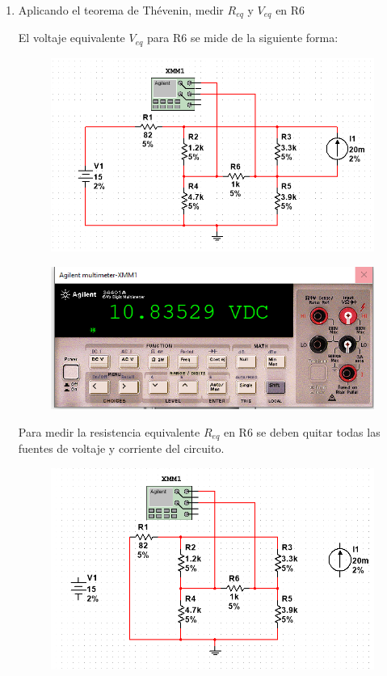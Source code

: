 \documentclass[12pt,a4paper]{article}
\begin{document}
\begin{enumerate}
\newpage



\item Aplicando el teorema de Thévenin, medir $R_{eq}$ y $V_{eq}$ en R6

El voltaje equivalente $V_{eq}$ para R6 se mide de la siguiente forma:

\begin{figure}[h!]
    \centering
    \includegraphics[scale=0.4]{T1.PNG}
    \label{fig:my_label}
\end{figure}


\begin{figure}[h!]
    \centering
    \includegraphics[scale=0.5]{T1.multi.PNG}
    \label{fig:my_label}
\end{figure}

Para medir la resistencia equivalente $R_{eq}$ en R6 se deben quitar todas las fuentes de voltaje y corriente del circuito.

\begin{figure}[h!]
    \centering
    \includegraphics[scale=0.4]{T2.PNG}
    \label{fig:my_label}
\end{figure}


\end{enumerate}
\end{document}
